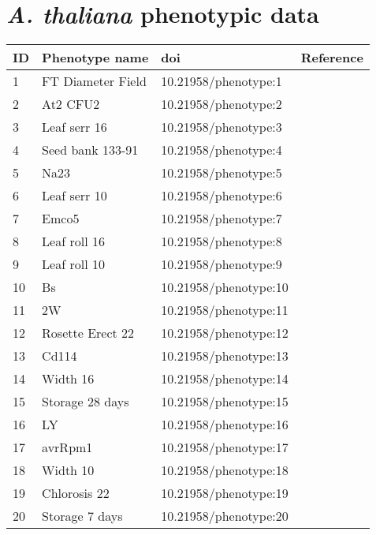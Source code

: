 
\chapter{\textit{A. thaliana} phenotypic data} %
\label{A:B}

\begin{longtable}{p{} p{} p{} p{}}
  \toprule
  ID & Phenotype name & doi & Reference \\
  \midrule
 1 & FT Diameter Field & 10.21958/phenotype:1 & \cite{atwell2010}\\
 2 & At2 CFU2 & 10.21958/phenotype:2 & \cite{atwell2010}\\
 3 & Leaf serr 16 & 10.21958/phenotype:3 & \cite{atwell2010}\\
 4 & Seed bank 133-91 & 10.21958/phenotype:4 & \cite{atwell2010}\\
 5 & Na23 & 10.21958/phenotype:5 & \cite{atwell2010}\\
 6 & Leaf serr 10 & 10.21958/phenotype:6 & \cite{atwell2010}\\
 7 & Emco5 & 10.21958/phenotype:7 & \cite{atwell2010}\\
 8 & Leaf roll 16 & 10.21958/phenotype:8 & \cite{atwell2010}\\
 9 & Leaf roll 10 & 10.21958/phenotype:9 & \cite{atwell2010}\\
 10 & Bs & 10.21958/phenotype:10 & \cite{atwell2010}\\
 11 & 2W & 10.21958/phenotype:11 & \cite{atwell2010}\\
 12 & Rosette Erect 22 & 10.21958/phenotype:12 & \cite{atwell2010}\\
 13 & Cd114 & 10.21958/phenotype:13 & \cite{atwell2010}\\
 14 & Width 16 & 10.21958/phenotype:14 & \cite{atwell2010}\\
 15 & Storage 28 days & 10.21958/phenotype:15 & \cite{atwell2010}\\
 16 & LY & 10.21958/phenotype:16 & \cite{atwell2010}\\
 17 & avrRpm1 & 10.21958/phenotype:17 & \cite{atwell2010}\\
 18 & Width 10 & 10.21958/phenotype:18 & \cite{atwell2010}\\
 19 & Chlorosis 22 & 10.21958/phenotype:19 & \cite{atwell2010}\\
 20 & Storage 7 days & 10.21958/phenotype:20 & \cite{atwell2010}\\

\end{longtable}
